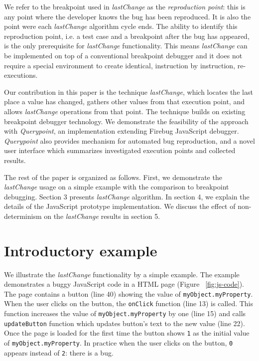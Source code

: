 \documentclass[runningheads,a4paper]{llncs}
\begin{document}
We refer to the breakpoint used in \textit{lastChange} as the
\textit{reproduction point}: this is any point where the developer knows
the bug has been reproduced. It is also the point were each \textit{lastChange}
algorithm cycle ends. The ability to identify this reproduction point, i.e.
 a test case and a breakpoint after the bug has appeared, is the only
prerequisite for \textit{lastChange} functionality.  This means
\textit{lastChange} can be implemented on top of a conventional
breakpoint debugger and it does not require a special environment to
create identical, instruction by instruction, re-executions.

Our contribution in this paper is the technique \textit{lastChange},
which locates the last place a value has changed, gathers other values
from that execution point, and allows \textit{lastChange} operations
from that point. The technique builds on existing breakpoint debugger
technology. We demonstrate the feasibility of the approach with %
\textit{Querypoint}, an implementation extending Firebug
JavaScript debugger. \textit{Querypoint} also provides mechanism for
automated bug reproduction, and a novel user interface which
summarizes investigated execution points and collected results.

The rest of the paper is organized as follows. First, we demonstrate
the \textit{lastChange} usage on a simple example with the comparison
to breakpoint debugging. Section 3 presents \textit{lastChange}
algorithm. In section 4, we explain the details of the JavaScript
prototype implementation. We discuss the effect of non-determinism on
the \textit{lastChange} results in section 5.  %

\section{Introductory example}
\label{sec:introExample}

We illustrate the \textit{lastChange} functionality by a simple
example. The example demonstrates a buggy JavaScript code in a HTML
page (Figure ~\ref{fig:js-code}). The page contains a button (line 40)
showing the value of \texttt{myObject.myProperty}.  When the user
clicks on the button, the \texttt{onClick} function (line 13) is
called. This function increases the value of
\texttt{myObject.myProperty} by one (line 15) and calls
\texttt{updateButton} function which updates button's text to the new
value (line 22).  Once the page is loaded for the first time the
button shows \texttt{1} as the initial value of
\texttt{myObject.myProperty}.  In practice when the user clicks on the
button, \texttt{0} appears instead of \texttt{2}: there is a bug.
\end{document}
